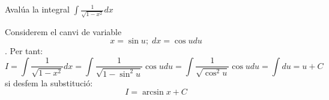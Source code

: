 \Exercise[title={$\int \sin^m x \cos^n x dx$ amb \(m , n \in Z^+\) i $m,n$ parells}]


Avalúa la integral $\int{ \frac{1}{\sqrt{1-x^2}}dx}$


\Answer 

    Considerem el canvi de variable
    \[x=\sin{u}; \; dx=\cos{u} du\].
    Per tant:
  \[
  I=\int \frac{1}{\sqrt{1-x^2}} dx = \int \frac{1}{\sqrt{1-\sin^2{u}}} \cos{u} du = \int \frac{1}{\sqrt{\cos^2{u}}} \cos{u}   du = \int du = u + C
  \]
  si desfem la substitució:
  \[
  I= \arcsin{x} + C
  \]

